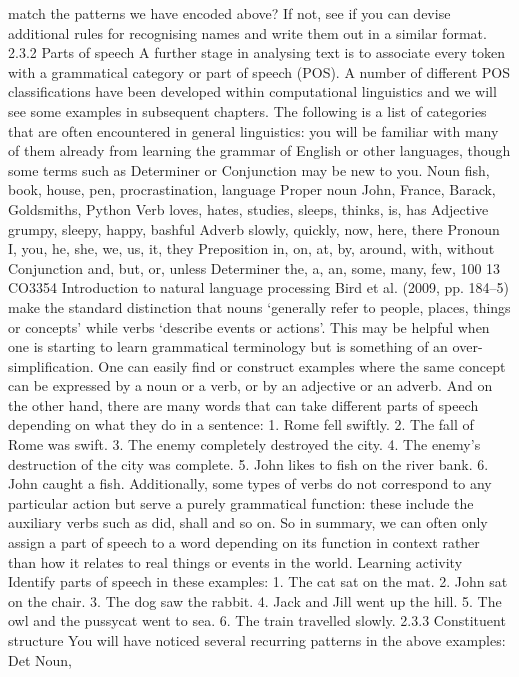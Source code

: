 match the patterns we have encoded above? If not, see if you can devise additional rules for
recognising names and write them out in a similar format.
2.3.2 Parts of speech
A further stage in analysing text is to associate every token with a grammatical
category or part of speech (POS). A number of different POS classifications have
been developed within computational linguistics and we will see some examples in
subsequent chapters. The following is a list of categories that are often encountered
in general linguistics: you will be familiar with many of them already from learning
the grammar of English or other languages, though some terms such as Determiner
or Conjunction may be new to you.
Noun fish, book, house, pen, procrastination, language
Proper noun John, France, Barack, Goldsmiths, Python
Verb loves, hates, studies, sleeps, thinks, is, has
Adjective grumpy, sleepy, happy, bashful
Adverb slowly, quickly, now, here, there
Pronoun I, you, he, she, we, us, it, they
Preposition in, on, at, by, around, with, without
Conjunction and, but, or, unless
Determiner the, a, an, some, many, few, 100
13
CO3354 Introduction to natural language processing
Bird et al. (2009, pp. 184–5) make the standard distinction that nouns ‘generally
refer to people, places, things or concepts’ while verbs ‘describe events or actions’.
This may be helpful when one is starting to learn grammatical terminology but is
something of an over-simplification. One can easily find or construct examples
where the same concept can be expressed by a noun or a verb, or by an adjective or
an adverb. And on the other hand, there are many words that can take different
parts of speech depending on what they do in a sentence:
1. Rome fell swiftly.
2. The fall of Rome was swift.
3. The enemy completely destroyed the city.
4. The enemy’s destruction of the city was complete.
5. John likes to fish on the river bank.
6. John caught a fish.
Additionally, some types of verbs do not correspond to any particular action but
serve a purely grammatical function: these include the auxiliary verbs such as did,
shall and so on. So in summary, we can often only assign a part of speech to a word
depending on its function in context rather than how it relates to real things or
events in the world.
Learning activity
Identify parts of speech in these examples:
1. The cat sat on the mat.
2. John sat on the chair.
3. The dog saw the rabbit.
4. Jack and Jill went up the hill.
5. The owl and the pussycat went to sea.
6. The train travelled slowly.
2.3.3 Constituent structure
You will have noticed several recurring patterns in the above examples: Det Noun,
